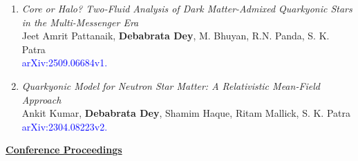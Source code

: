 \begin{enumerate}
\item \textit{Core or Halo? Two-Fluid Analysis of Dark Matter-Admixed Quarkyonic Stars in the Multi-Messenger Era}\\ 
 Jeet Amrit Pattanaik, \textbf{Debabrata Dey}, M. Bhuyan, R.N. Panda, S. K. Patra \\
\textcolor{blue}{arXiv:2509.06684v1.}\\ 

\item \textit{Quarkyonic Model for Neutron Star Matter: A Relativistic Mean-Field Approach}\\ 
Ankit Kumar, \textbf{Debabrata Dey}, Shamim Haque, Ritam Mallick, S. K. Patra\\
\textcolor{blue}{ arXiv:2304.08223v2.}\\ 
\end{enumerate}  
\textbf{\large\underline{Conference Proceedings}}
